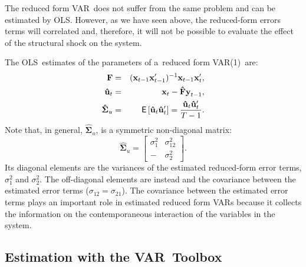 \documentclass[11pt,a4paper]{report}
\numberwithin{equation}{chapter}
\numberwithin{section}{chapter}
\begin{document}
The reduced form VAR\ does not suffer from the same problem and can be
estimated by OLS. However, as we have seen above, the reduced-form errors
terms will correlated and, therefore, it will not be possible to evaluate
the effect of the structural shock on the system.

The OLS\ estimates of the parameters of a\ reduced form VAR(1)\ are:%
\begin{eqnarray*}
\mathbf{F} &=&(\mathbf{x}_{t-1}\mathbf{x}_{t-1}^{\prime })^{-1}\mathbf{x}%
_{t-1}\mathbf{x}_{t}^{\prime }, \\
\mathbf{\hat{u}}_{t} &=&\mathbf{x}_{t}-\mathbf{\hat{F}y}_{t-1}, \\
\mathbf{\hat{\Sigma}}_{u} &=&\mathsf{E}\left[ \mathbf{\hat{u}}_{t}\mathbf{%
\hat{u}}_{t}^{\prime }\right] =\frac{\mathbf{\hat{u}}_{t}\mathbf{\hat{u}}%
_{t}^{\prime }}{T-1}.
\end{eqnarray*}%
Note that, in general, $\mathbf{\hat{\Sigma}}_{u}$, is a symmetric
non-diagonal matrix:%
\begin{equation*}
\mathbf{\hat{\Sigma}}_{u}=\left[ 
\begin{array}{cc}
\sigma _{1}^{2} & \sigma _{12}^{2} \\ 
- & \sigma _{2}^{2}%
\end{array}%
\right] .
\end{equation*}%
Its diagonal elements are the variances of the estimated reduced-form error
terms, $\sigma _{1}^{2}$ and $\sigma _{2}^{2}$. The off-diagonal elements
are instead and the covariance between the estimated error terms ($\sigma
_{12}=\sigma _{21}$). The covariance between the estimated error terms plays
an important role in estimated reduced form VARs because it collects the
information on the contemporaneous interaction of the variables in the
system.

\subsection{Estimation with the VAR\ Toolbox}
\end{document}
